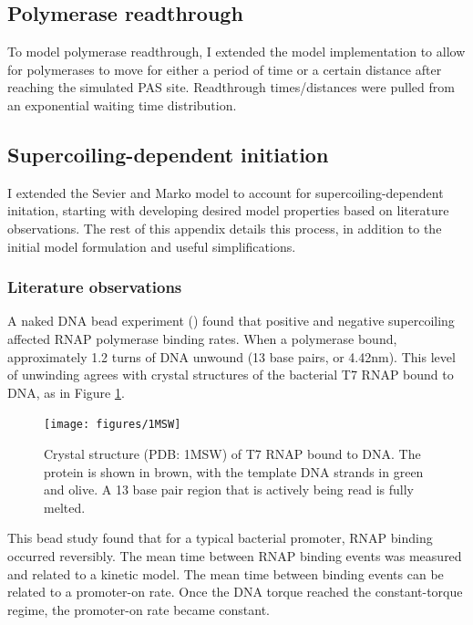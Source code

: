 \documentclass[11pt]{article}
\begin{document}
\subsection{Polymerase readthrough}
To model polymerase readthrough, I extended the model implementation to allow for polymerases to move for either a period of time or a certain distance after reaching the simulated PAS site. Readthrough times/distances were pulled from an exponential waiting time distribution.

\subsection{Supercoiling-dependent initiation}
I extended the Sevier and Marko model to account for supercoiling-dependent initation, starting with developing desired model properties based on literature observations. The rest of this appendix details this process, in addition to the initial model formulation and useful simplifications.

\subsubsection{Literature observations}
A naked DNA bead experiment (\textcite{revyakinPromoterUnwindingPromoter2004}) found that positive and negative supercoiling affected RNAP polymerase binding rates. When a polymerase bound, approximately 1.2 turns of DNA unwound (13 base pairs, or 4.42nm). This level of unwinding agrees with crystal structures of the bacterial T7 RNAP bound to DNA, as in Figure \ref{fig:rnap_bound}.

\begin{figure}[h]
    \centering
    \texttt{[image: figures/1MSW]}
    \caption{Crystal structure (PDB: 1MSW) of T7 RNAP bound to DNA. The protein is shown in brown, with the template DNA strands in green and olive.
             A 13 base pair region that is actively being read is fully melted.}
    \label{fig:rnap_bound}
\end{figure}

This bead study found that for a typical bacterial promoter, RNAP binding occurred reversibly. The mean time between RNAP binding events was measured and related to a kinetic model. The mean time between binding events can be related to a promoter-on rate. Once the DNA torque reached the constant-torque regime, the promoter-on rate became constant.
\end{document}
